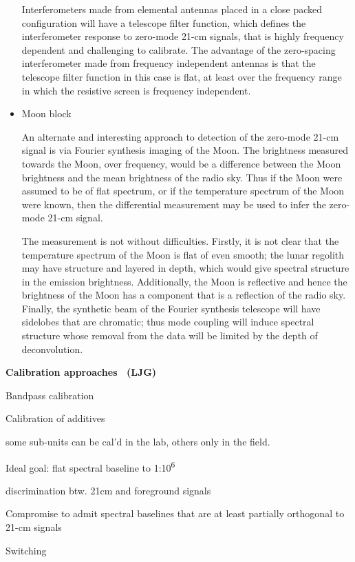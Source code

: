 \begin{itemize}
  Interferometers made from elemental antennas placed in a close packed configuration will have a telescope filter function, which defines the interferometer response to zero-mode 21-cm signals, that is highly frequency dependent and challenging to calibrate.  The advantage of the zero-spacing interferometer made from frequency independent antennas is that the telescope filter function in this case is flat, at least over the frequency range in which the resistive screen is frequency independent.  
  
  \item
  Moon block
  
  An alternate and interesting approach to detection of the zero-mode 21-cm signal is via Fourier synthesis imaging of the Moon.  The brightness measured towards the Moon, over frequency, would be a difference between the Moon brightness and the mean brightness of the radio sky.  Thus if the Moon were assumed to be of flat spectrum, or if the temperature spectrum of the Moon were known, then the differential measurement may be used to infer the zero-mode 21-cm signal.
  
  The measurement is not without difficulties.  Firstly, it is not clear that the temperature spectrum of the Moon is flat of even smooth; the lunar regolith may have structure and layered in depth, which would give spectral structure in the emission brightness.  Additionally, the Moon is reflective and hence the brightness of the Moon has a component that is a reflection of the radio sky. Finally, the synthetic beam of the Fourier synthesis telescope will have sidelobes that are chromatic; thus mode coupling will induce spectral structure whose removal from the data will be limited by the depth of deconvolution. 
    
\end{itemize}


\textbf{Calibration approaches{~ }(LJG)}

Bandpass calibration

Calibration of additives

some sub-units can be cal'd in the lab, others only in the field.

Ideal goal: flat spectral baseline to 1:10\textsuperscript{6}{~}

discrimination btw. 21cm and foreground signals

Compromise to admit spectral baselines that are at least partially
orthogonal to 21-cm signals

Switching

